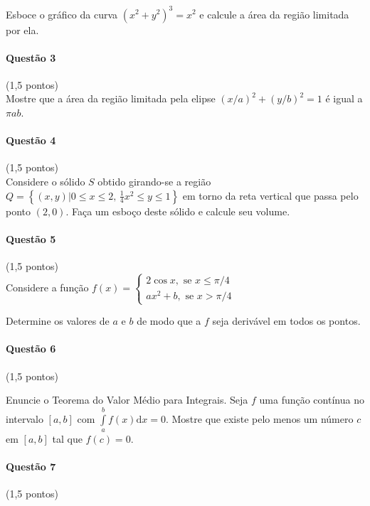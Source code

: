 \documentclass[12pt,a4paper]{article}
\newcommand{\dd}{\mathrm{d}}
\begin{document}
Esboce o gráfico da curva $(x^2+y^2)^3=x^2$ e calcule a área da região limitada por ela.

\paragraph{Questão 3} (1,5 pontos)\\

Mostre que a área da região limitada pela elipse $(x/a)^2 + (y/b)^2 = 1$ é igual a $\pi ab$.

\paragraph{Questão 4} (1,5 pontos)\\

Considere o sólido $S$ obtido girando-se a região $Q=\left\{ (x,y) \vert 0\le x \le 2,\, \frac{1}{4}x^2 \le y \le 1  \right\}$ em torno da reta vertical que passa pelo ponto $(2,0)$. Faça um esboço deste sólido e calcule seu volume.

\paragraph{Questão 5} (1,5 pontos)\\

Considere a função $f(x) = \begin{cases}2\cos x, \text{ se }x\le \pi /4 \\ ax^2 + b, \text{ se } x> \pi /4 \end{cases}$

Determine os valores de $a$ e $b$ de modo que a $f$ seja derivável em todos os pontos.


\paragraph{Questão 6} (1,5 pontos)\\

\begin{tasks}
\task Enuncie o Teorema do Valor Médio para Integrais.
\task Seja $f$ uma função contínua no intervalo $[a,b]$ com $\displaystyle\int\limits_{a}^{b} f(x) \dd x = 0$. Mostre que existe pelo menos um número $c$ em $[a,b]$ tal que $f(c) = 0$.
\end{tasks}

\paragraph{Questão 7} (1,5 pontos)\\
\end{document}
